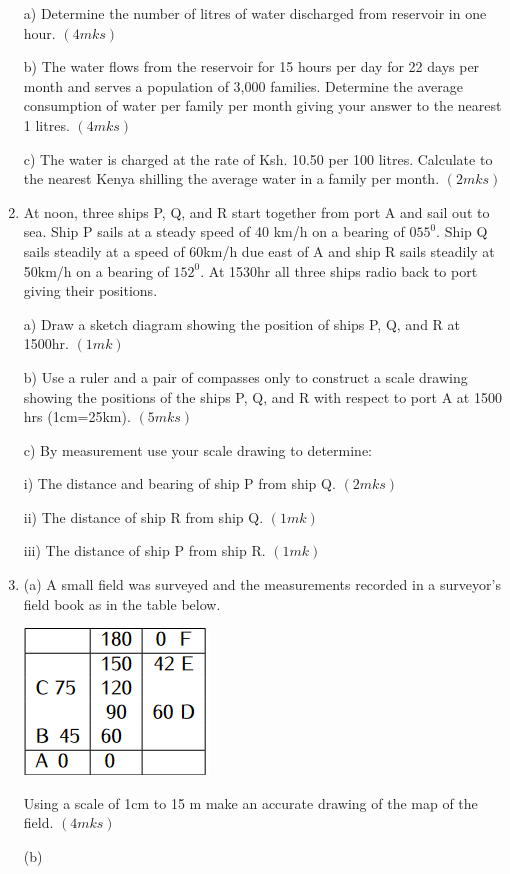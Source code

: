 \documentclass[
  a4paperpaper,
]{scrbook}
\begin{document}
\begin{tcolorbox}
\begin{enumerate}
  a) Determine the number of litres of water discharged from reservoir
  in one hour. \((4mks)\)

  b) The water flows from the reservoir for 15 hours per day for 22 days
  per month and serves a population of 3,000 families. Determine the
  average consumption of water per family per month giving your answer
  to the nearest 1 litres. \((4mks)\)

  c) The water is charged at the rate of Ksh. 10.50 per 100 litres.
  Calculate to the nearest Kenya shilling the average water in a family
  per month. \((2mks)\)
\item
  At noon, three ships P, Q, and R start together from port A and sail
  out to sea. Ship P sails at a steady speed of 40 km/h on a bearing of
  \(055^0\). Ship Q sails steadily at a speed of 60km/h due east of A
  and ship R sails steadily at 50km/h on a bearing of \(152^0\). At
  1530hr all three ships radio back to port giving their positions.

  a) Draw a sketch diagram showing the position of ships P, Q, and R at
  1500hr. \((1mk)\)

  b) Use a ruler and a pair of compasses only to construct a scale
  drawing showing the positions of the ships P, Q, and R with respect to
  port A at 1500 hrs (1cm=25km). \((5mks)\)

  c) By measurement use your scale drawing to determine:

  i) The distance and bearing of ship P from ship Q. \((2mks)\)

  ii) The distance of ship R from ship Q. \((1mk)\)

  iii) The distance of ship P from ship R. \((1mk)\)
\item
  (a) A small field was surveyed and the measurements recorded in a
  surveyor's field book as in the table below.

  \includegraphics{figures/Md6_Q19a.png}

  Using a scale of 1cm to 15 m make an accurate drawing of the map of
  the field. \((4mks)\)

  (b)


\end{enumerate}
\end{tcolorbox}
\end{document}
